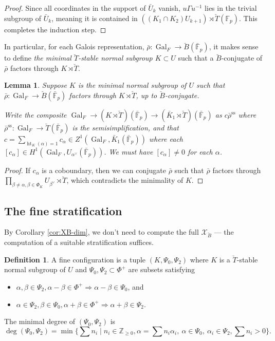 \documentclass[11pt]{amsart}
\newcommand{\MINOREDITED}[1]{#1}
\newtheorem{lem}[thm]{Lemma}
\theoremstyle{definition}
\newtheorem{defn}[thm]{Definition}
\newcommand{\Z}{\mathbb{Z}}
\newcommand{\bF}{\mathbb{F}}
\renewcommand{\SS}{{\operatorname{ss}}}
\newcommand{\bFp}{\bar{\mathbb{F}}_p}
\newcommand{\cX}{\mathcal{X}}
\newcommand{\bB}{\breve{B}}
\newcommand{\bT}{\breve{T}}
\DeclareMathOperator{\Ht}{ht}
\DeclareMathOperator{\Gal}{Gal}
\begin{document}
\begin{proof}
Since all coordinates in the support of $\bar{U}_k$ vanish, $u \Gamma u^{-1}$ lies in the trivial subgroup of $\bar{U}_k$, meaning it is contained in $((K_1\cap K_2)U_{k+1}) \rtimes \bT(\bF_p)$. This completes the induction step.
\end{proof}

In particular,
for each Galois representation,
$\bar\rho:\Gal_F\to \bB(\bFp)$,
it makes sense to define
{\it the minimal $\bT$-stable normal subgroup
$K\subset U$}
such that a $\bB$-conjugate of $\bar\rho$
factors through
$K\rtimes \bT$.



\begin{lem}
\rm
Suppose $K$ is the minimal normal subgroup
of $U$ such that
$\bar\rho:\Gal_F\to \bB(\bFp)$
factors through
$K\rtimes \bT$,
up to $\bB$-conjugate.

Write the composite
$\Gal_F \to (K\rtimes \bT)(\bFp)
\to (\bar K_1 \rtimes \bT)(\bFp)$
as $c \bar\rho^{\SS}$
where $\bar\rho^{\SS}:\Gal_F\to \bT(\bFp)$
is the semisimplification,
and that
$c=\sum_{\Ht_K(\alpha)=1} c_\alpha
\in Z^1(\Gal_F, \bar K_1(\bFp))$
where each $[c_\alpha]\in H^1(\Gal_F, U_{\alpha^\vee}(\bFp))$.
We must have
$[c_\alpha]\neq 0$
for each $\alpha$.
\label{lem:K-nonzero}
\end{lem}

\begin{proof}
If $c_\alpha$ is a coboundary,
then we can conjugate $\bar\rho$
such that $\bar\rho$
factors through $\prod_{\beta\neq \alpha, \beta\in \Phi_K}U_{\beta^\vee}\rtimes \bT$,
which contradicts the minimality of $K$.
\end{proof}

\subsection{The fine stratification}

By Corollary 
\ref{cor:XB-dim},
we don't need to compute the full $\cX_{\bB}$
--- the computation of a suitable stratification suffices.


\begin{defn}
A fine configuration is a tuple $(K,\Psi_0,\Psi_2)$
where
$K$ is a $\bT$-stable normal subgroup of $U$ and
$\Psi_0, \Psi_2\subset \Phi^+$
are subsets
satisfying
\begin{itemize}
\item $\alpha, \beta\in \MINOREDITED{\Psi_2}, \alpha-\beta\in \Phi^+
\Rightarrow \alpha-\beta\in\MINOREDITED{\Psi_0}$, and
\item $\alpha\in \MINOREDITED{\Psi_2}, \beta\in \MINOREDITED{\Psi_0}, \alpha+\beta\in \Phi^+
\Rightarrow \alpha+\beta\in \MINOREDITED{\Psi_2}$.
\end{itemize}

\iffalse
The minimal degree of $(\Psi_0,\Psi_2)$
is
\[
\deg(\Psi_0,\Psi_2)
=
\min\{\sum n_i\mid n_i\in\Z_{\ge 0},
\alpha=\sum n_i \alpha_i,~
\alpha\in\Psi_0,~ \alpha_i\in \Psi_2,
\sum n_i>0
\}.
\]
\end{defn}
\end{document}
